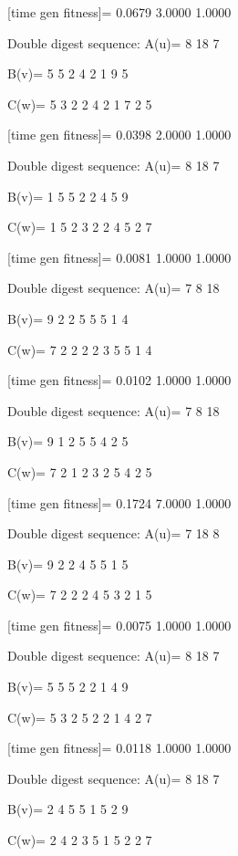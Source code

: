 [time gen fitness]=
    0.0679    3.0000    1.0000

Double digest sequence:
A(u)=
     8    18     7

B(v)=
     5     5     2     4     2     1     9     5

C(w)=
     5     3     2     2     4     2     1     7     2     5

[time gen fitness]=
    0.0398    2.0000    1.0000

Double digest sequence:
A(u)=
     8    18     7

B(v)=
     1     5     5     2     2     4     5     9

C(w)=
     1     5     2     3     2     2     4     5     2     7

[time gen fitness]=
    0.0081    1.0000    1.0000

Double digest sequence:
A(u)=
     7     8    18

B(v)=
     9     2     2     5     5     5     1     4

C(w)=
     7     2     2     2     2     3     5     5     1     4

[time gen fitness]=
    0.0102    1.0000    1.0000

Double digest sequence:
A(u)=
     7     8    18

B(v)=
     9     1     2     5     5     4     2     5

C(w)=
     7     2     1     2     3     2     5     4     2     5

[time gen fitness]=
    0.1724    7.0000    1.0000

Double digest sequence:
A(u)=
     7    18     8

B(v)=
     9     2     2     4     5     5     1     5

C(w)=
     7     2     2     2     4     5     3     2     1     5

[time gen fitness]=
    0.0075    1.0000    1.0000

Double digest sequence:
A(u)=
     8    18     7

B(v)=
     5     5     5     2     2     1     4     9

C(w)=
     5     3     2     5     2     2     1     4     2     7

[time gen fitness]=
    0.0118    1.0000    1.0000

Double digest sequence:
A(u)=
     8    18     7

B(v)=
     2     4     5     5     1     5     2     9

C(w)=
     2     4     2     3     5     1     5     2     2     7

